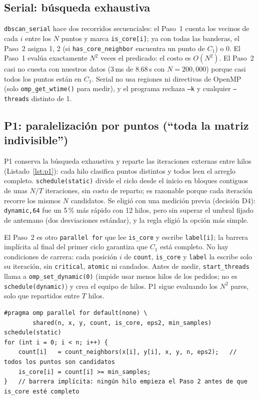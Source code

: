 \documentclass[11pt,letterpaper]{article}
\newcommand{\code}[1]{\texttt{#1}}
\begin{document}
\subsection{Serial: búsqueda exhaustiva}
\code{dbscan\_serial} hace dos recorridos secuenciales: el Paso~1 cuenta los vecinos de cada $i$ entre los $N$
puntos y marca \code{is\_core[i]}; ya con todas las banderas, el Paso~2 asigna 1, 2 (si \code{has\_core\_neighbor}
encuentra un punto de $C_1$) o 0. El Paso~1 evalúa exactamente $N^2$ veces el predicado: el costo es $O(N^2)$. El
Paso~2 casi no cuesta con nuestros datos (3\,ms de 8.68\,s con $N=200{,}000$) porque casi todos los puntos están en
$C_1$. Serial no usa regiones ni directivas de OpenMP (solo \code{omp\_get\_wtime()} para medir), y el programa
rechaza \code{--k} y cualquier \code{--threads} distinto de 1.

\subsection{P1: paralelización por puntos (``toda la matriz indivisible'')}
P1 conserva la búsqueda exhaustiva y reparte las iteraciones externas entre hilos (Listado~\ref{lst:p1}): cada hilo
clasifica puntos distintos y todos leen el arreglo completo. \code{schedule(static)} divide el ciclo desde el inicio
en bloques contiguos de unas $N/T$ iteraciones, sin costo de reparto; es razonable porque cada iteración recorre los
mismos $N$ candidatos. Se eligió con una medición previa (decisión D4): \code{dynamic,64} fue un 5\,\% más rápido
con 12 hilos, pero sin superar el umbral fijado de antemano (dos desviaciones estándar), y la regla eligió la opción
más simple.

El Paso~2 es otro \code{parallel for} que lee \code{is\_core} y escribe \code{label[i]}; la barrera implícita al
final del primer ciclo garantiza que $C_1$ está completo. No hay condiciones de carrera: cada posición $i$ de
\code{count}, \code{is\_core} y \code{label} la escribe solo su iteración, sin \code{critical}, \code{atomic} ni
candados. Antes de medir, \code{start\_threads} llama a \code{omp\_set\_dynamic(0)} (impide usar menos hilos de los
pedidos; no es \code{schedule(dynamic)}) y crea el equipo de hilos. P1 sigue evaluando los $N^2$ pares, solo que
repartidos entre $T$ hilos.

\begin{lstlisting}[caption={Paso 1 de P1. Cada iteración escribe únicamente las posiciones de su punto.},label={lst:p1}]
#pragma omp parallel for default(none) \
        shared(n, x, y, count, is_core, eps2, min_samples) schedule(static)
for (int i = 0; i < n; i++) {
    count[i]   = count_neighbors(x[i], y[i], x, y, n, eps2);   // todos los puntos son candidatos
    is_core[i] = count[i] >= min_samples;
}   // barrera implícita: ningún hilo empieza el Paso 2 antes de que is_core esté completo
\end{lstlisting}
\end{document}
